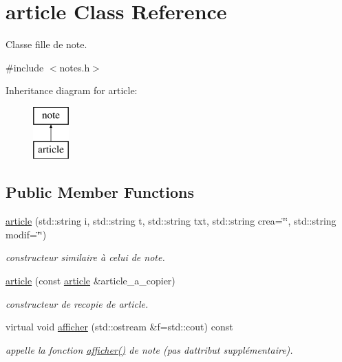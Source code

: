 \hypertarget{classarticle}{}\section{article Class Reference}
\label{classarticle}


Classe fille de note.  




{\ttfamily \#include $<$notes.\+h$>$}

Inheritance diagram for article\+:\begin{figure}[H]
\begin{center}
\leavevmode
\includegraphics[height=2.000000cm]{classarticle}
\end{center}
\end{figure}
\subsection*{Public Member Functions}
\begin{DoxyCompactItemize}
\item 
\hyperlink{classarticle_a867baf47c29d2fb267ed4670d082d9c4}{article} (std\+::string i, std\+::string t, std\+::string txt, std\+::string crea=\char`\"{}\char`\"{}, std\+::string modif=\char`\"{}\char`\"{})
\begin{DoxyCompactList}\small\item\em constructeur similaire à celui de note. \end{DoxyCompactList}\item 
\mbox{\label{classarticle_a126aafdac25309fab3eebf52e78e2083}} 
\hyperlink{classarticle_a126aafdac25309fab3eebf52e78e2083}{article} (const \hyperlink{classarticle}{article} \&article\+\_\+a\+\_\+copier)
\begin{DoxyCompactList}\small\item\em constructeur de recopie de article. \end{DoxyCompactList}\item 
\mbox{\label{classarticle_aedb5047877f01a317e1345f898f71bf3}} 
virtual void \hyperlink{classarticle_aedb5047877f01a317e1345f898f71bf3}{afficher} (std\+::ostream \&f=std\+::cout) const
\begin{DoxyCompactList}\small\item\em appelle la fonction \hyperlink{classarticle_aedb5047877f01a317e1345f898f71bf3}{afficher()} de note (pas d\textquotesingle{}attribut supplémentaire). \end{DoxyCompactList}\end{DoxyCompactItemize}
